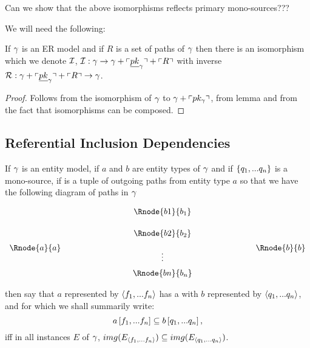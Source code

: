 \begin{newtt}
Can we show that the above isomorphisms reflects primary mono-sources???
\end{newtt}


 We will need the following:
\begin{lemma}
If $\gamma$ is an ER model and if $R$ is a set of paths of $\gamma$ then 
there is an isomorphism which we denote $\mathcal{I}$, 
$\mathcal{I}: \gamma \rightarrow \gamma + \left\ulcorner\underline{pk}_\gamma\right\urcorner + \left\ulcorner R\right\urcorner$
with inverse $\mathcal{R}:  \gamma + \left\ulcorner\underline{pk}_\gamma\right\urcorner + \left\ulcorner R\right\urcorner \rightarrow \gamma$.
\end{lemma}
\begin{proof}
Follows from the isomorphism of $\gamma$ to $\gamma + \left\ulcorner pk_{\gamma}\right\urcorner$, from 
lemma  and from the fact that isomorphisms can be composed.
\end{proof}

\subsection{Referential Inclusion Dependencies}

\begin{definition}
If $\gamma$ is an entity model, 
if $a$ and $b$ are entity types of  $\gamma$ and  if $\left\{q_1,...q_n\right\}$
is a mono-source,
if \fntuple is a tuple of outgoing paths from entity type $a$  
so that we have the following diagram of paths in $\gamma$
\setlength{\arraycolsep}{.2cm}
\begin{center}
$
\begin{array}{cp{2cm}ccp{2cm}c}
             & &         & \Rnode{b1}{b_1} &&               \\ [0.5cm]
						 & &         & \Rnode{b2}{b_2} &&               \\ [0.2cm]
\Rnode{a}{a} & &         &                 &&  \Rnode{b}{b} \\ [-0.2cm]						
             & &         &    \vdots       &&               \\ [0.2cm]
             & &         & \Rnode{bn}{b_n} &&               \\ 
\end{array}
$
\end{center}
then say that $a$ represented by $\langle f_1,...f_n\rangle$ 
has a  with $b$ represented by $\langle q_1,...q_n\rangle$, and for which we shall summarily write:
$$
a\left[f_1,...f_n\right]\subseteq b\left[q_1,...q_n\right],
$$
iff in all instances $E$ of $\gamma$,
$img(E_{\langle f_1,...f_n\rangle}) \subseteq img(E_{\langle q_1,...q_n\rangle})$. 
\end{definition}

